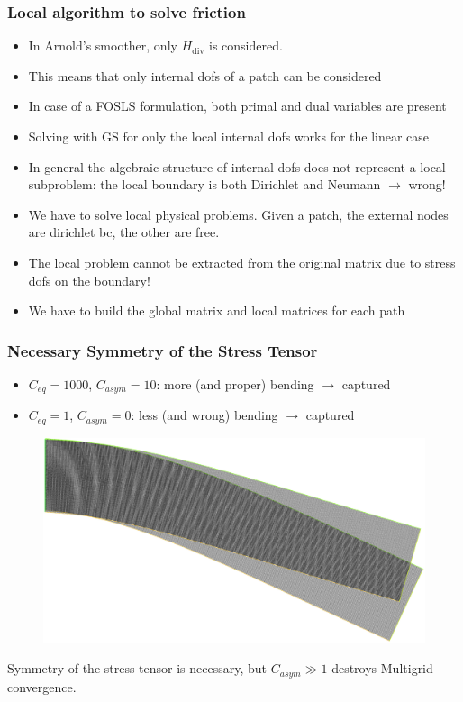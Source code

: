 \documentclass[8pt, oneside]{beamer}   	%
\begin{document}
\begin{frame}
\frametitle{\textbf{Local algorithm to solve friction}}
\begin{itemize}
\item In Arnold's smoother, only $H_{\text{div}}$ is considered.
\item This means that only internal dofs of a patch can be considered
\item In case of a FOSLS formulation, both primal and dual variables are present
\item Solving with GS for only the local internal dofs works for the linear case
\item In general the algebraic structure of internal dofs does not represent a local subproblem: the local boundary is both Dirichlet and Neumann $\to$ wrong!
\item We have to solve local physical problems. Given a patch, the external nodes are dirichlet bc, the other are free. 
\item The local problem cannot be extracted from the original matrix due to stress dofs on the boundary!
\item We have to build the global matrix and local matrices for each path
\end{itemize}
\end{frame}




\begin{frame}
\frametitle{\textbf{Necessary Symmetry of the Stress Tensor}}
\begin{itemize}
\item $C_{eq}=1000$, $C_{asym}=10$: more (and proper) bending $\to$  captured
\item $C_{eq}=1$, $C_{asym}=0$: less (and wrong) bending $\to$  captured
\end{itemize}
\begin{figure}[htbp!]
		\centering
	\includegraphics[scale=0.05]{img/nonbendingbeam}
\end{figure}
Symmetry of the stress tensor is necessary, but $C_{asym} \gg 1$ destroys Multigrid convergence.
\end{frame}
\end{document}

